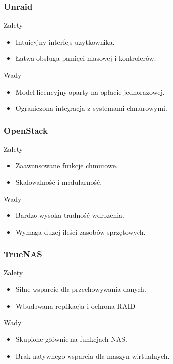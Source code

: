 \subsubsection{Unraid}
\begin{minipage}{0.45\textwidth}
    Zalety
    \begin{itemize}
        \item Intuicyjny interfejs uzytkownika.
        \item Łatwa obsługa pamięci masowej i kontrolerów.
    \end{itemize}
\end{minipage}\hfil
\begin{minipage}{0.45\textwidth}
    Wady
    \begin{itemize}
        \item Model licencyjny oparty na opłacie jednorazowej.
        \item Ograniczona integracja z systemami chmurowymi.
    \end{itemize}
\end{minipage}

\subsubsection{OpenStack}
\begin{minipage}{0.45\textwidth}
    Zalety
    \begin{itemize}
        \item Zaawansowane funkcje chmurowe.
        \item Skalowalność i modularność.
    \end{itemize}
\end{minipage}\hfil
\begin{minipage}{0.45\textwidth}
    Wady
    \begin{itemize}
        \item Bardzo wysoka trudność wdrozenia.
        \item Wymaga duzej ilości zasobów sprzętowych.
    \end{itemize}
\end{minipage}

\subsubsection{TrueNAS}
\begin{minipage}{0.45\textwidth}
    Zalety
    \begin{itemize}
        \item Silne wsparcie dla przechowywania danych.
        \item Wbudowana replikacja i ochrona RAID
    \end{itemize}
\end{minipage}\hfil
\begin{minipage}{0.45\textwidth}
    Wady
    \begin{itemize}
        \item Skupione głównie na funkcjach NAS.
        \item Brak natywnego wsparcia dla maszyn wirtualnych.
    \end{itemize}
\end{minipage}


